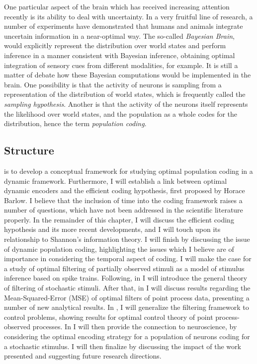 One particular aspect of the brain which has received increasing attention recently is its ability to deal with uncertainty. In a very fruitful line of research, a number 
of experiments have demonstrated that humans and animals integrate uncertain information in a near-optimal way. The so-called {\em Bayesian Brain},\cite{Knill2004} 
would explicitly represent the distribution over world states and perform inference in a manner consistent with Bayesian inference, obtaining optimal integration of 
sensory cues from different modalities, for example. It is still a matter of debate how these Bayesian computations would be implemented in the brain. One possibility 
is that the activity of neurons is sampling from a representation of the distribution of world states,\cite{Berkes2011} which is frequently called the {\em sampling 
hypothesis}. Another is that the activity of the neurons itself represents the likelihood over world states,\cite{Ma2006} and the population as a whole codes for the 
distribution, hence the term {\em population coding}.\par

\subsection*{Structure}

 is to develop a conceptual framework for studying optimal population coding in a dynamic framework. Furthermore, I will
establish a link between optimal dynamic encoders and the efficient coding hypothesis, first proposed by Horace Barlow.\cite{Barlow1961} I believe that the 
inclusion of time into the coding framework raises a number of questions, which have not been addressed in the scientific literature properly. In the remainder of this 
chapter, I will discuss the efficient coding hypothesis and its more recent developments, and I will touch upon its relationship to Shannon's information theory.\cite{Shannon1948} I will finish by discussing the issue of dynamic population coding, highlighting the issues which I believe are of importance in considering the 
temporal aspect of coding. I will make the case for a study of optimal filtering of partially observed stimuli as a model of stimulus inference based on spike trains. 
Following, in   I will introduce the general theory of filtering of stochastic stimuli. After that, in  I will discuss results regarding the 
Mean-Squared-Error (MSE) of optimal filters of point process data, presenting a number of new analytical results. In , I will generalize the filtering 
framework to control problems, showing results for optimal control theory of point process-observed processes. In  I will then provide the connection 
to neuroscience, by considering the optimal encoding strategy for a population of neurons coding for a stochastic stimulus. I will then finalize by discussing the impact 
of the work presented and suggesting future research directions.\par

